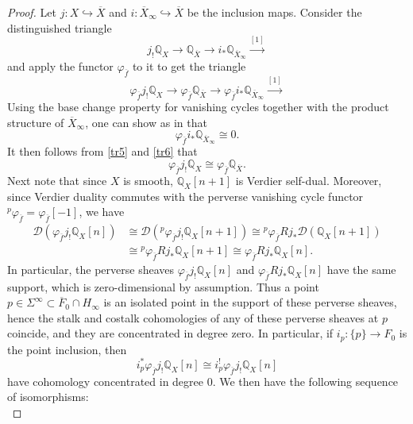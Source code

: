 \documentclass[12pt,leqno,twoside]{amsart}
\theoremstyle{remark}
\theoremstyle{remark}
\theoremstyle{definition}
\theoremstyle{remark}
\theoremstyle{remark}
\theoremstyle{remark}
\numberwithin{equation}{section}  %
\newcommand{\lra}{\longrightarrow}
\newcommand{\Q}{\mathbb{Q}}
\newcommand{\cD}{\mathcal{D}}
\newcommand{\of}{\overline{f}}
\newcommand{\oX}{\overline{X}}
\newcommand{\oF}{\overline{F}}
\begin{document}
\begin{proof}
Let $j:X  \hookrightarrow \oX$ and $i: \oX_\infty  \hookrightarrow \oX$ be the inclusion maps. Consider the distinguished triangle
\[ j_!\Q_X \lra \Q_{\oX} \lra i_* \Q_{\oX_\infty} \overset{[1]}{\lra} \]
and apply the functor $\varphi_{\of}$ to it to get the triangle
\begin{equation}\label{tr5}
\varphi_{\of} j_!\Q_X \lra \varphi_{\of} \Q_{\oX} \lra \varphi_{\of} i_* \Q_{\oX_\infty} \overset{[1]}{\lra}
\end{equation}
Using the base change property for vanishing cycles together with the product structure of $\oX_\infty$, one can show as in \cite[Ex.6.2.20, p.190]{Di} that 
\begin{equation}\label{tr6}
\varphi_{\of} i_* \Q_{\oX_\infty} \cong 0.
\end{equation}
It then follows from \eqref{tr5}  and \eqref{tr6} that
\begin{equation}\label{tr7}
\varphi_{\of} j_!\Q_X \cong \varphi_{\of} \Q_{\oX}.
\end{equation}
Next note that since $X$ is smooth, $\Q_X[n+1]$ is Verdier self-dual. Moreover, since Verdier duality commutes with the perverse vanishing cycle functor ${^p}\varphi_{\of}=\varphi_{\of}[-1]$, we have
\begin{equation}\label{tr8}
\begin{split}
\cD \left(\varphi_{\of} j_!\Q_X[n] \right) &\cong 
\cD \left({^p}\varphi_{\of} j_!\Q_X[n+1] \right) \cong
{^p}\varphi_{\of} Rj_* \cD \left(\Q_X[n+1] \right) \\ &\cong
{^p}\varphi_{\of} Rj_* \Q_X[n+1] 
\cong \varphi_{\of} Rj_*\Q_{X}[n].
\end{split}
\end{equation}
In particular, the perverse sheaves $\varphi_{\of} j_!\Q_X[n]$ and $\varphi_{\of} Rj_*\Q_{X}[n]$ have the same support, which is zero-dimensional by assumption. Thus a point $p\in \Sigma^\infty \subset \oF_0 \cap H_\infty$ is an isolated point in the support of these perverse sheaves, hence the stalk and costalk cohomologies of any of these perverse sheaves at $p$ coincide, and they are concentrated in degree zero. In particular, if $i_p:\{p\} \to F_0$ is the point inclusion, then
\begin{equation}\label{tr9}
i_p^* \varphi_{\of} j_!\Q_X[n] \cong i_p^! \varphi_{\of} j_!\Q_X[n]
\end{equation}
have cohomology concentrated in degree $0$. We then have the following sequence of isomorphisms:
\begin{equation}\label{tr10}

\end{equation}
\end{proof}
\end{document}
